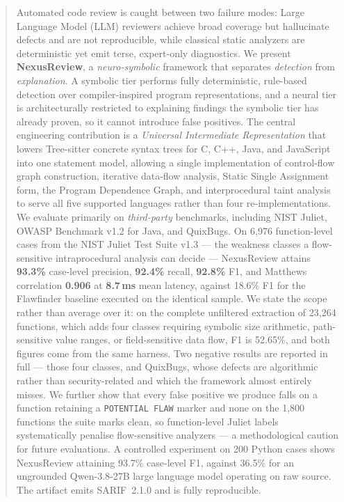 \documentclass[10pt,conference]{IEEEtran}
\begin{document}
\begin{abstract}
Automated code review is caught between two failure modes: Large Language
Model (LLM) reviewers achieve broad coverage but hallucinate defects and are
not reproducible, while classical static analyzers are deterministic yet emit
terse, expert-only diagnostics. We present \textbf{NexusReview}, a
\emph{neuro-symbolic} framework that separates \emph{detection} from
\emph{explanation}. A symbolic tier performs fully deterministic,
rule-based detection over compiler-inspired program representations, and a
neural tier is architecturally restricted to explaining findings the symbolic
tier has already proven, so it cannot introduce false positives. The central
engineering contribution is a \emph{Universal Intermediate Representation}
that lowers Tree-sitter concrete syntax trees for C, C++, Java, and
JavaScript into one statement model, allowing a single implementation of
control-flow graph construction, iterative data-flow analysis,
Static Single Assignment form, the Program Dependence Graph, and
interprocedural taint analysis to serve all five supported languages rather
than four re-implementations. We evaluate primarily on \emph{third-party}
benchmarks, including NIST Juliet, OWASP Benchmark v1.2 for Java, and
QuixBugs. On 6{,}976 function-level cases from the NIST Juliet Test Suite
v1.3 --- the weakness classes a flow-sensitive intraprocedural analysis can
decide --- NexusReview attains \textbf{93.3\%} case-level precision,
\textbf{92.4\%} recall, \textbf{92.8\%} F1, and Matthews correlation
\textbf{0.906} at \textbf{8.7\,ms} mean latency, against 18.6\% F1 for the
Flawfinder baseline executed on the identical sample. We state the scope
rather than average over it: on the complete unfiltered extraction of
23{,}264 functions, which adds four classes requiring symbolic size
arithmetic, path-sensitive value ranges, or field-sensitive data flow, F1 is
52.65\%, and both figures come from the same harness. Two negative results are
reported in full --- those four classes, and QuixBugs, whose defects are
algorithmic rather than security-related and which the framework almost
entirely misses. We further show that every false positive we produce falls on
a function retaining a \texttt{POTENTIAL FLAW} marker and none on the 1{,}800
functions the suite marks clean, so function-level Juliet labels
systematically penalise flow-sensitive analyzers --- a methodological caution
for future evaluations. A controlled experiment on 200 Python cases shows NexusReview
attaining 93.7\% case-level F1, against 36.5\% for an ungrounded
Qwen-3.8-27B large language model operating on raw source. The artifact
emits SARIF~2.1.0 and is fully reproducible.
\end{abstract}
\end{document}
